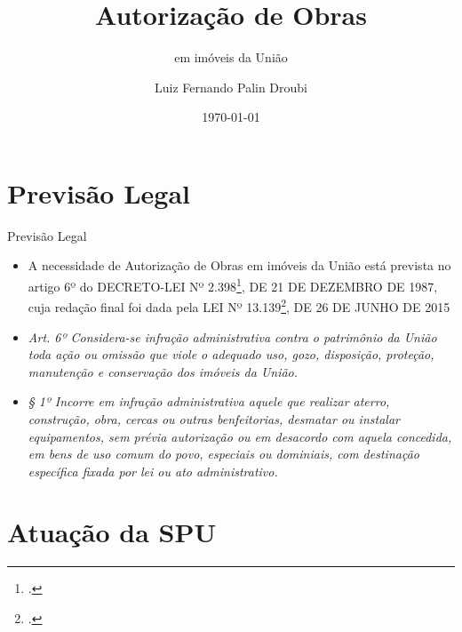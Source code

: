 \documentclass[9pt,ignorenonframetext,]{beamer}
\title[]{Autorização de Obras}
\subtitle{em imóveis da União}
\author[
        Luiz Fernando Palin Droubi
    ]{Luiz Fernando Palin Droubi}
\institute[
    ]{
    Superintendênia do Patrimônio da União em Santa Catarina
    }
\date[
      \today
  ]{
      \today
        }
\providecommand{\tightlist}{%
  \setlength{\itemsep}{0pt}\setlength{\parskip}{0pt}}
\begin{document}
  \begin{frame}[plain]
  \titlepage
  \end{frame}


  \begin{frame}
  \tableofcontents[hideallsubsections]
  \end{frame}

\hypertarget{previsuxe3o-legal}{%
\section{Previsão Legal}\label{previsuxe3o-legal}}

\begin{frame}{Previsão Legal}

\begin{itemize}[<+->]
\tightlist
\item
  \alert<1>{A necessidade de Autorização de Obras em imóveis da União está
  prevista no artigo 6º do DECRETO-LEI Nº 2.398\footcite{brasil_dl_1987}, DE 21 DE
  DEZEMBRO DE 1987, cuja redação final foi dada pela LEI Nº
  13.139\footcite{brasil_l13139}, DE 26 DE JUNHO DE 2015}
\end{itemize}

\begin{itemize}[<+->]
\tightlist
\item
  \alert<2>{\emph{Art. 6º Considera-se infração administrativa contra o
  patrimônio da União toda ação ou omissão que viole o adequado uso, gozo,
  disposição, proteção, manutenção e conservação dos imóveis da União.}}
\end{itemize}

\begin{itemize}[<+->]
\tightlist
\item
  \alert<3>{\emph{§ 1º Incorre em infração administrativa aquele que realizar
  aterro, construção, obra, cercas ou outras benfeitorias, desmatar ou instalar
  equipamentos, sem prévia autorização ou em desacordo com aquela concedida, em
  bens de uso comum do povo, especiais ou dominiais, com destinação específica
  fixada por lei ou ato administrativo.}}
\end{itemize}

\end{frame}

\hypertarget{atuauxe7uxe3o-da-spu}{%
\section{Atuação da SPU}\label{atuauxe7uxe3o-da-spu}}
\end{document}
